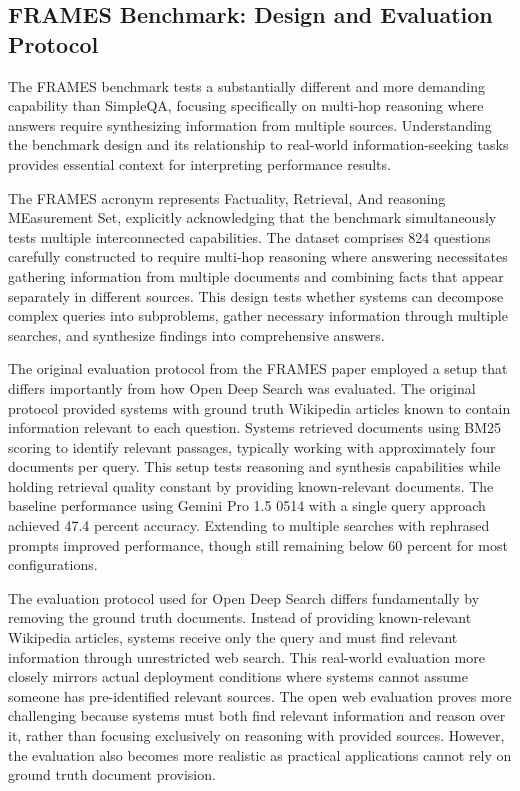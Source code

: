 \subsection{FRAMES Benchmark: Design and Evaluation Protocol}

The FRAMES benchmark tests a substantially different and more demanding capability than SimpleQA, focusing specifically on multi-hop reasoning where answers require synthesizing information from multiple sources. Understanding the benchmark design and its relationship to real-world information-seeking tasks provides essential context for interpreting performance results.

The FRAMES acronym represents Factuality, Retrieval, And reasoning MEasurement Set, explicitly acknowledging that the benchmark simultaneously tests multiple interconnected capabilities. The dataset comprises 824 questions carefully constructed to require multi-hop reasoning where answering necessitates gathering information from multiple documents and combining facts that appear separately in different sources. This design tests whether systems can decompose complex queries into subproblems, gather necessary information through multiple searches, and synthesize findings into comprehensive answers.

The original evaluation protocol from the FRAMES paper employed a setup that differs importantly from how Open Deep Search was evaluated. The original protocol provided systems with ground truth Wikipedia articles known to contain information relevant to each question. Systems retrieved documents using BM25 scoring to identify relevant passages, typically working with approximately four documents per query. This setup tests reasoning and synthesis capabilities while holding retrieval quality constant by providing known-relevant documents. The baseline performance using Gemini Pro 1.5 0514 with a single query approach achieved 47.4 percent accuracy. Extending to multiple searches with rephrased prompts improved performance, though still remaining below 60 percent for most configurations.

The evaluation protocol used for Open Deep Search differs fundamentally by removing the ground truth documents. Instead of providing known-relevant Wikipedia articles, systems receive only the query and must find relevant information through unrestricted web search. This real-world evaluation more closely mirrors actual deployment conditions where systems cannot assume someone has pre-identified relevant sources. The open web evaluation proves more challenging because systems must both find relevant information and reason over it, rather than focusing exclusively on reasoning with provided sources. However, the evaluation also becomes more realistic as practical applications cannot rely on ground truth document provision.

